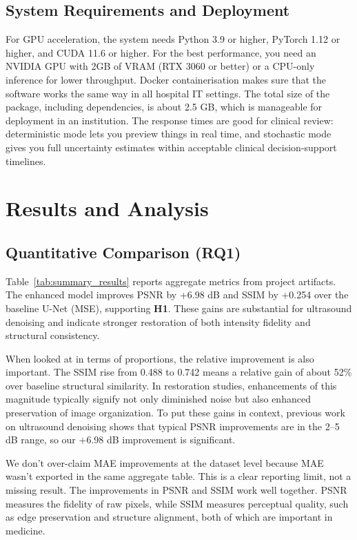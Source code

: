 \documentclass[conference]{IEEEtran}
\begin{document}
\subsection{System Requirements and Deployment}
For GPU acceleration, the system needs Python 3.9 or higher, PyTorch 1.12 or higher, and CUDA 11.6 or higher. For the best performance, you need an NVIDIA GPU with 2GB of VRAM (RTX 3060 or better) or a CPU-only inference for lower throughput. Docker containerisation makes sure that the software works the same way in all hospital IT settings. The total size of the package, including dependencies, is about 2.5 GB, which is manageable for deployment in an institution. The response times are good for clinical review: deterministic mode lets you preview things in real time, and stochastic mode gives you full uncertainty estimates within acceptable clinical decision-support timelines.

\section{Results and Analysis}
\subsection{Quantitative Comparison (RQ1)}
Table~\ref{tab:summary_results} reports aggregate metrics from project artifacts. The enhanced model improves PSNR by +6.98 dB and SSIM by +0.254 over the baseline U-Net (MSE), supporting \textbf{H1}. These gains are substantial for ultrasound denoising and indicate stronger restoration of both intensity fidelity and structural consistency.

When looked at in terms of proportions, the relative improvement is also important. The SSIM rise from 0.488 to 0.742 means a relative gain of about 52\% over baseline structural similarity. In restoration studies, enhancements of this magnitude typically signify not only diminished noise but also enhanced preservation of image organization. To put these gains in context, previous work on ultrasound denoising shows that typical PSNR improvements are in the 2–5 dB range, so our +6.98 dB improvement is significant.

We don't over-claim MAE improvements at the dataset level because MAE wasn't exported in the same aggregate table. This is a clear reporting limit, not a missing result. The improvements in PSNR and SSIM work well together. PSNR measures the fidelity of raw pixels, while SSIM measures perceptual quality, such as edge preservation and structure alignment, both of which are important in medicine.
\end{document}
